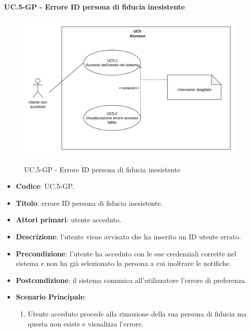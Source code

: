 		\paragraph{UC\theuccount.5-GP - Errore ID persona di fiducia inesistente}
		\begin{figure}[H]
			\centering
			\includegraphics[width=\columnwidth]{img/UC5.png}\\
			\caption{UC\theuccount.5-GP - Errore ID persona di fiducia inesistente}
		\end{figure}
		\begin{itemize}
			\item \textbf{Codice}: UC\theuccount.5-GP.
			\item \textbf{Titolo}: errore ID persona di fiducia inesistente.
			\item \textbf{Attori primari}: utente acceduto.
			\item \textbf{Descrizione}: l’utente viene avvisato che ha inserito un ID utente errato.
			\item \textbf{Precondizione}: l’utente ha acceduto con le sue credenziali corrette nel
			sistema e non ha già selezionato la persona a cui inoltrare le notifiche.
			\item \textbf{Postcondizione}: il sistema comunica all’utilizzatore l’errore di preferenza.
			\item \textbf{Scenario Principale}:
			\begin{enumerate}
				\item Utente acceduto procede alla rimozione della sua persona di fiducia ma questa non esiste e
				visualizza l'errore.
			\end{enumerate}
		\end{itemize}
		
